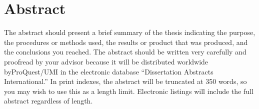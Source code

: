 \documentclass[\main/master.tex]{subfiles}
\begin{document}
\chapter*{Abstract}
\hspace{5 mm} The abstract should present a brief summary of the thesis indicating the purpose, the procedures or
methods used, the results or product that was produced, and the conclusions you reached. The abstract should be written very carefully and proofread by your advisor because it will be distributed worldwide byProQuest\textsuperscript{\tiny\textregistered}/UMI in the electronic database “Dissertation Abstracts International.” In print indexes, the abstract will be truncated at 350 words, so you may wish to use this as a length limit. Electronic listings will include the full abstract regardless of length. 
\end{document}
